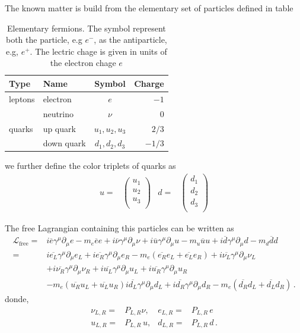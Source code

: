 \begin{frame}
The known matter is build from the elementary set of particles defined in table
\begin{table}
  \centering
  \begin{tabular}{l|l|c|r}
    Type &Name & Symbol&Charge\\\hline{}
   leptons& electron & $e$& $-1$\\
          & neutrino & $\nu$ & $0$\\\hline{}
   quarks &up quark & $u_1,u_2,u_3$ & $2/3$\\
          &down quark & $d_1,d_2,d_3$& $-1/3$\\
  \end{tabular}
  \caption{Elementary fermions. The symbol represent both the particle, e.g $e^-$, as the antiparticle, e.g, $e^+$. The lectric chage is given in units of the electron chage $e$  }
  \label{tab:ef}
\end{table}

we further define the color triplets of quarks as
\begin{align}
  u=&
  \begin{pmatrix}
    u_1 \\ u_2\\ u_3\\
  \end{pmatrix}
  &d=&
  \begin{pmatrix}
    d_1 \\ d_2 \\ d_3\\
  \end{pmatrix}
\end{align}


The free Lagrangian containing this particles can be written as
\begin{align}
  \mathcal{L}_{\text{free}}=&i\overline{e}\gamma^\mu\partial_\mu e-m_e\overline{e}e+i\overline{\nu}\gamma^\mu\partial_\mu\nu
+i\overline{u}\gamma^\mu\partial_\mu u-m_u\overline{u}u+i\overline{d}\gamma^\mu\partial_\mu d-m_d\overline{d}d\nonumber\\
=&i\overline{e_L}\gamma^\mu\partial_\mu e_L+i\overline{e_R}\gamma^\mu\partial_\mu e_R-m_e(\overline{e_R}e_L+\overline{e_L}e_R)+i\overline{\nu_L}\gamma^\mu\partial_\mu\nu_L\nonumber\\
&+i\overline{\nu_R}\gamma^\mu\partial_\mu\nu_R+i\overline{u_L}\gamma^\mu\partial_\mu u_L+i\overline{u_R}\gamma^\mu\partial_\mu u_R\nonumber\\
&-m_e(\overline{u_R}u_L+\overline{u_L}u_R)
i\overline{d_L}\gamma^\mu\partial_\mu d_L+i\overline{d_R}\gamma^\mu\partial_\mu d_R-m_e(\overline{d_R}d_L+\overline{d_L}d_R)\,.
\end{align}
donde,
\begin{align}
  \nu_{L,R}=&P_{L,R}\nu,& e_{L,R}=&P_{L,R}\,e\nonumber\\
  u_{L,R}=&P_{L,R}\,u,& d_{L,R}=&P_{L,R}\,d\,.
\end{align}


\end{frame}

